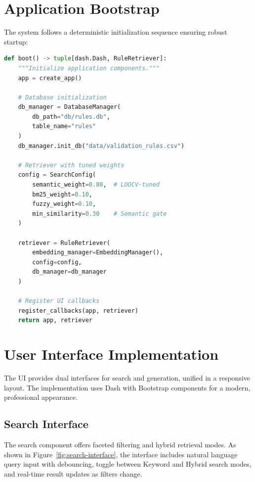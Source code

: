 \section{Application Bootstrap}

The system follows a deterministic initialization sequence ensuring robust startup:

\begin{lstlisting}[language=Python, caption={Bootstrap sequence (app.py)}, label={lst:bootstrap}]
def boot() -> tuple[dash.Dash, RuleRetriever]:
    """Initialize application components."""
    app = create_app()
    
    # Database initialization
    db_manager = DatabaseManager(
        db_path="db/rules.db",
        table_name="rules"
    )
    db_manager.init_db("data/validation_rules.csv")
    
    # Retriever with tuned weights
    config = SearchConfig(
        semantic_weight=0.80,  # LOOCV-tuned
        bm25_weight=0.10,
        fuzzy_weight=0.10,
        min_similarity=0.30    # Semantic gate
    )
    
    retriever = RuleRetriever(
        embedding_manager=EmbeddingManager(),
        config=config,
        db_manager=db_manager
    )
    
    # Register UI callbacks
    register_callbacks(app, retriever)
    return app, retriever
\end{lstlisting}

\section{User Interface Implementation}

The UI provides dual interfaces for search and generation, unified in a responsive layout. The implementation uses Dash with Bootstrap components for a modern, professional appearance.

\subsection{Search Interface}

The search component offers faceted filtering and hybrid retrieval modes. As shown in Figure~\ref{fig:search-interface}, the interface includes natural language query input with debouncing, toggle between Keyword and Hybrid search modes, and real-time result updates as filters change.

